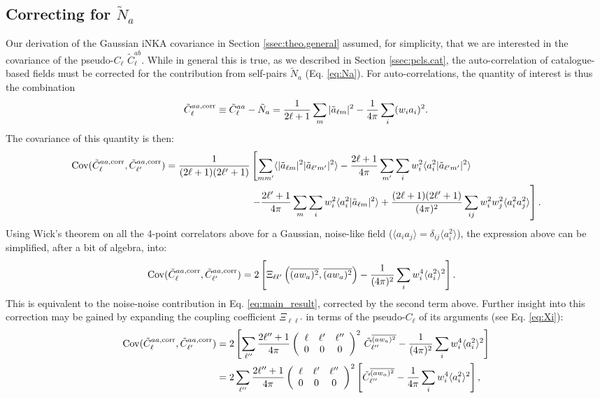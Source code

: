 \documentclass[%
 reprint,
superscriptaddress,
nofootinbib,
 amsmath,amssymb,
 aps,
 prd,
]{revtex4-2}
\newcommand{\wtj}[6]{\left(\begin{array}{ccc} #1 & #2 & #3\\#4 & #5 & #6\end{array} \right)}
\begin{document}
  \subsection{Correcting for \texorpdfstring{$\tilde{N}_a$}{field shot noise}}
    Our derivation of the Gaussian iNKA covariance in Section \ref{ssec:theo.general} assumed, for simplicity, that we are interested in the covariance of the pseudo-$C_\ell$ $\tilde{C}^{ab}_\ell$. While in general this is true, as we described in Section \ref{ssec:pcls.cat}, the auto-correlation of catalogue-based fields must be corrected for the contribution from self-pairs $\tilde{N}_a$ (Eq. \ref{eq:Na}). For auto-correlations, the quantity of interest is thus the combination
    \begin{equation}
      \tilde{C}^{aa,{\rm corr}}_\ell\equiv \tilde{C}^{aa}_\ell-\tilde{N}_a=\frac{1}{2\ell+1}\sum_m|\tilde{a}_{\ell m}|^2-\frac{1}{4\pi}\sum_i(w_ia_i)^2.
    \end{equation}
    The covariance of this quantity is then:
    \begin{align}\nonumber
      {\rm Cov}(\tilde{C}^{aa,{\rm corr}}_\ell,\tilde{C}^{aa,{\rm corr}}_{\ell'})=\frac{1}{(2\ell+1)(2\ell'+1)}&\left[\sum_{mm'}\langle |\tilde{a}_{\ell m}|^2|\tilde{a}_{\ell' m'}|^2\rangle-\frac{2\ell+1}{4\pi}\sum_{m'}\sum_iw_i^2\langle a_i^2|\tilde{a}_{\ell' m'}|^2\rangle\right.\\\nonumber
      &\left.-\frac{2\ell'+1}{4\pi}\sum_m\sum_iw_i^2\langle a_i^2|\tilde{a}_{\ell m}|^2\rangle+\frac{(2\ell+1)(2\ell'+1)}{(4\pi)^2}\sum_{ij}w_i^2w_j^2\langle a_i^2a_j^2\rangle
      \right].
    \end{align}
    Using Wick's theorem on all the 4-point correlators above for a Gaussian, noise-like field ($\langle a_ia_j\rangle=\delta_{ij}\langle a_i^2\rangle$), the expression above can be simplified, after a bit of algebra, into:
    \begin{align}
      {\rm Cov}(\tilde{C}^{aa,{\rm corr}}_\ell,\tilde{C}^{aa,{\rm corr}}_{\ell'})
      &=2\left[\Xi_{\ell\ell'}\left(\overline{(aw_a)^2},\overline{(aw_a)^2}\right)-\frac{1}{(4\pi)^2}\sum_i w_i^4\langle a_i^2\rangle^2\right].
    \end{align}
    This is equivalent to the noise-noise contribution in Eq. \ref{eq:main_result}, corrected by the second term above. Further insight into this correction may be gained by expanding the coupling coefficient $\Xi_{\ell\ell'}$ in terms of the pseudo-$C_\ell$ of its arguments (see Eq. \ref{eq:Xi}):
    \begin{align}\nonumber
      {\rm Cov}(\tilde{C}^{aa,{\rm corr}}_\ell,\tilde{C}^{aa,{\rm corr}}_{\ell'})
      &=2\left[\sum_{\ell''}\frac{2\ell''+1}{4\pi}\wtj{\ell}{\ell'}{\ell''}{0}{0}{0}^2\,\tilde{C}^{\overline{(aw_a)^2}}_{\ell''}-\frac{1}{(4\pi)^2}\sum_i w_i^4\langle a_i^2\rangle^2\right]\\
      &=2\sum_{\ell''}\frac{2\ell''+1}{4\pi}\wtj{\ell}{\ell'}{\ell''}{0}{0}{0}^2\left[\tilde{C}^{\overline{(aw_a)^2}}_{\ell''}-\frac{1}{4\pi}\sum_i w_i^4\langle a_i^2\rangle^2\right],
    \end{align}
\end{document}
